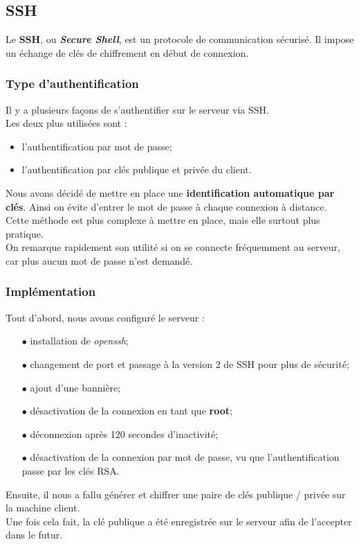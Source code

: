 \subsection{SSH}
\label{subsec:ssh}

Le \textbf{SSH}, ou \textit{\textbf{Secure Shell}}, est un protocole de
communication sécurisé. Il impose un échange de clés de chiffrement en début de
connexion.


\subsubsection{Type d'authentification}
\label{subsubsec:type-authentification}

Il y a plusieurs façons de s'authentifier sur le serveur via SSH. \\
Les deux plus utilisées sont :
\begin{itemize}
    \item l'authentification par mot de passe;
    \item l'authentification par clés publique et privée du client. \\
\end{itemize}

Nous avons décidé de mettre en place une \textbf{identification automatique par
clés}. Ainsi on évite d'entrer le mot de passe à chaque connexion à distance. \\
Cette méthode est plus complexe à mettre en place, mais elle surtout plus
pratique. \\

On remarque rapidement son utilité si on se connecte fréquemment au serveur, car
plus aucun mot de passe n'est demandé.


\subsubsection{Implémentation}
\label{subsubsec:implementation}

Tout d'abord, nous avons configuré le serveur :
\begin{itemize}

    \item[$\bullet$] installation de \textit{openssh};
    \item[$\bullet$] changement de port et passage à la version 2 de SSH pour plus de
    sécurité;
    \item[$\bullet$] ajout d'une bannière;
    \item[$\bullet$] désactivation de la connexion en tant que \textbf{root};
    \item[$\bullet$] déconnexion après 120 secondes d'inactivité;
    \item[$\bullet$] désactivation de la connexion par mot de passe, vu que l'authentification
    passe par les clés RSA. \\

\end{itemize}

Ensuite, il nous a fallu générer et chiffrer une paire de clés publique /
privée sur la machine client. \\
Une fois cela fait, la clé publique a été enregistrée sur le serveur afin de
l'accepter dans le futur.


